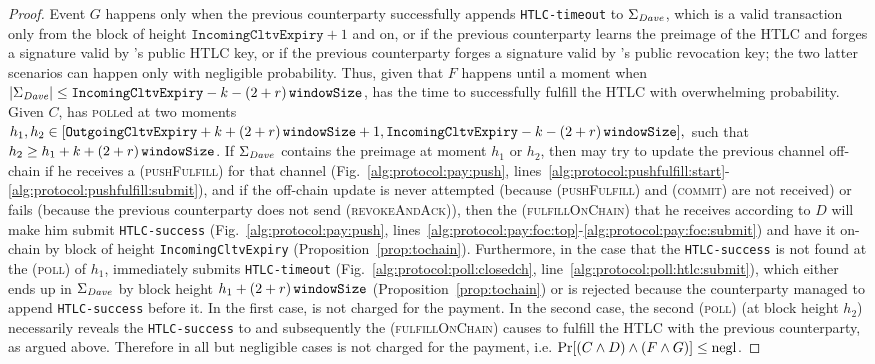 \begin{proof}
  Event $G$ happens only when the previous counterparty successfully appends
  \texttt{HTLC-timeout} to $\Sigma_{\mathit{Dave}}$, which is a valid transaction only
  from the block of height $\mathtt{IncomingCltvExpiry} + 1$ and on, or if the
  previous counterparty learns the preimage of the HTLC and forges a signature
  valid by \dave's public HTLC key, or if the previous counterparty forges a
  signature valid by \dave's public revocation key; the two latter scenarios can
  happen only with negligible probability. Thus, given that $F$ happens until a
  moment when $|\Sigma_{\mathit{Dave}}| \leq \mathtt{IncomingCltvExpiry} - k -
  \left(2 + r\right)\texttt{windowSize}{}$, \dave{} has the time to successfully fulfill the HTLC with
  overwhelming probability. Given $C$, \dave{} has \textsc{poll}ed at two
  moments $h_1, h_2 \in [\mathtt{OutgoingCltvExpiry} + k + \left(2 + r\right)\texttt{windowSize}{} + 1,
  \mathtt{IncomingCltvExpiry} - k - \left(2 + r\right)\texttt{windowSize}{}],$ such that $h_2 \geq h_1 + k +
  \left(2 + r\right)\texttt{windowSize}{}$. If $\Sigma_{\mathit{Dave}}$ contains the preimage at moment $h_1$ or
  $h_2$, then \dave{} may try to update the previous channel off-chain if he
  receives a (\textsc{pushFulfill}) for that channel
  (Fig.~\ref{alg:protocol:pay:push},
  lines~\ref{alg:protocol:pushfulfill:start}-\ref{alg:protocol:pushfulfill:submit}),
  and if the off-chain update is never attempted (because (\textsc{pushFulfill})
  and (\textsc{commit}) are not received) or fails (because the previous
  counterparty does not send (\textsc{revokeAndAck})), then the
  (\textsc{fulfillOnChain}) that he receives according to $D$ will make him
  submit \texttt{HTLC-success} (Fig.~\ref{alg:protocol:pay:push},
  lines~\ref{alg:protocol:pay:foc:top}-\ref{alg:protocol:pay:foc:submit}) and
  have it on-chain by block of height \texttt{IncomingCltvExpiry}
  (Proposition~\ref{prop:tochain}). Furthermore, in the case that the
  \texttt{HTLC-success} is not found at the (\textsc{poll}) of $h_1$, \dave{}
  immediately submits \texttt{HTLC-timeout}
  (Fig.~\ref{alg:protocol:poll:closedch},
  line~\ref{alg:protocol:poll:htlc:submit}), which either ends up in
  $\Sigma_{\mathit{Dave}}$ by block height $h_1 + \left(2 + r\right)\texttt{windowSize}{}$
  (Proposition~\ref{prop:tochain}) or is rejected because the counterparty
  managed to append \texttt{HTLC-success} before it. In the first case, \dave{}
  is not charged for the payment. In the second case, the second (\textsc{poll})
  (at block height $h_2$) necessarily reveals the \texttt{HTLC-success} to
  \dave{} and subsequently the (\textsc{fulfillOnChain}) causes \dave{} to
  fulfill the HTLC with the previous counterparty, as argued above. Therefore in
  all but negligible cases \dave{} is not charged for the payment, i.e. $\Pr[(C
  \wedge D) \wedge (F \wedge G)] \leq \text{negl}$.


\end{proof}

